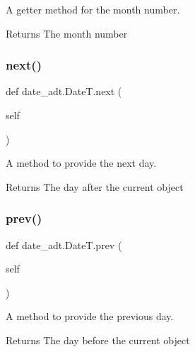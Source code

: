A getter method for the month number. 

\begin{DoxyReturn}{Returns}
The month number 
\end{DoxyReturn}
\mbox{\label{classdate__adt_1_1_date_t_a9d77bfd2612084a826385017cc9d91e7}} 
\subsubsection{\texorpdfstring{next()}{next()}}
{\footnotesize\ttfamily def date\+\_\+adt.\+Date\+T.\+next (\begin{DoxyParamCaption}\item[{}]{self }\end{DoxyParamCaption})}



A method to provide the next day. 

\begin{DoxyReturn}{Returns}
The day after the current object 
\end{DoxyReturn}
\mbox{\label{classdate__adt_1_1_date_t_aaa4e6b382d483a0e263213ce68802f11}} 
\subsubsection{\texorpdfstring{prev()}{prev()}}
{\footnotesize\ttfamily def date\+\_\+adt.\+Date\+T.\+prev (\begin{DoxyParamCaption}\item[{}]{self }\end{DoxyParamCaption})}



A method to provide the previous day. 

\begin{DoxyReturn}{Returns}
The day before the current object 
\end{DoxyReturn}
\mbox{\label{classdate__adt_1_1_date_t_a29a9e1387bbdf0b7d9b36a0d940fd1cc}} 
